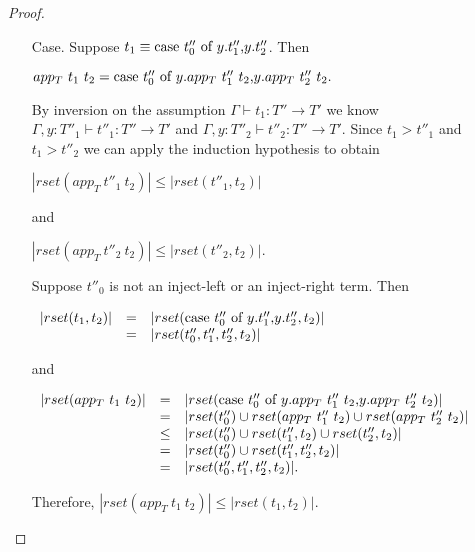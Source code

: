 \begin{proof}
\begin{itemize}
\begin{itemize}
  \item[Case.] Suppose $t_1 \equiv \mbox{case}\ t''_0\ \text{of}\ y\text{.}t''_1\text{,}y\text{.}t''_2$.  Then 
    \begin{center}
      \begin{math}
        app_T\ t_1\ t_2 = \mbox{case}\ t''_0\ \text{of}\ y\text{.}app_T\ t''_1\ t_2\text{,}y\text{.}app_T\ t''_2\ t_2.
      \end{math}
    \end{center}
    By inversion on the assumption $\Gamma \vdash t_1:T'' \to T'$ we know 
    $\Gamma,y:T''_1 \vdash t''_1:T'' \to T'$ and $\Gamma,y:T''_2 \vdash t''_2:T'' \to T'$.
    Since $t_1 > t''_1$ and $t_1 > t''_2$ we can apply the induction hypothesis to obtain
    \begin{center}
      \begin{math}
        |rset(app_T\ t''_1\ t_2)| \leq |rset(t''_1,t_2)|
      \end{math}
    \end{center}
    and
    \begin{center}
      \begin{math}
        |rset(app_T\ t''_2\ t_2)| \leq |rset(t''_2,t_2)|.
      \end{math}
    \end{center}
    Suppose $t''_0$ is not an inject-left or an inject-right term.  Then
    \begin{center}
      \begin{math}
        \begin{array}{lll}
          |rset(t_1,t_2)| & = & |rset(\mbox{case}\ t''_0\ \text{of}\ y\text{.}t''_1\text{,}y\text{.}t''_2, t_2)|\\
          & = & |rset(t''_0,t''_1,t''_2,t_2)|
        \end{array}
      \end{math}
    \end{center}
    and
    \begin{center}
      \begin{math}
        \begin{array}{lll}
          |rset(app_T\ t_1\ t_2)| & = & |rset(\mbox{case}\ t''_0\ \text{of}\ y\text{.}app_T\ t''_1\ t_2\text{,}y\text{.}app_T\ t''_2\ t_2)|\\
          & = & |rset(t''_0) \cup rset(app_T\ t''_1\ t_2) \cup rset(app_T\ t''_2\ t_2)|\\
          & \leq & |rset(t''_0) \cup rset(t''_1, t_2) \cup rset(t''_2, t_2)|\\
          & = & |rset(t''_0) \cup rset(t''_1, t''_2, t_2)|\\
          & = & |rset(t''_0, t''_1, t''_2, t_2)|.
        \end{array}
      \end{math}
    \end{center}
    Therefore, $|rset(app_T\ t_1\ t_2)| \leq |rset(t_1,t_2)|$.


\end{itemize}
\end{itemize}
\end{proof}
